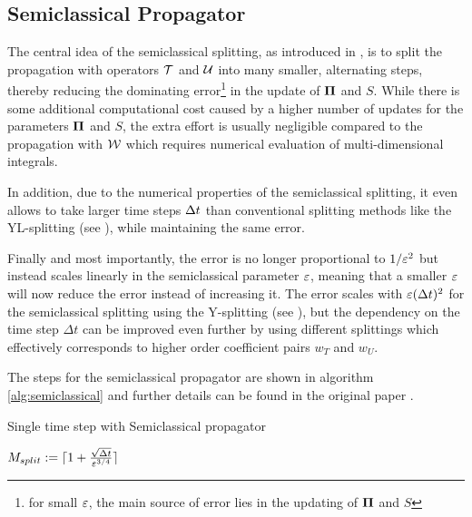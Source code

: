 \subsection{Semiclassical Propagator}
\label{sub:semiclassical_propagator}
%
The central idea of the semiclassical splitting, as introduced in \cite{GH_convsemiclassical},
is to split the propagation with operators $\mathcal{T}$ and $\mathcal{U}$ into many smaller, alternating steps, thereby reducing the dominating error\footnote{for small $\varepsilon$,
the main source of error lies in the updating of $\bm{\Pi}$ and $S$} in the update of $\bm{\Pi}$ and $S$.
While there is some additional computational cost caused by a higher number of updates for the parameters $\bm{\Pi}$ and $S$, the extra effort is usually negligible compared to the propagation with $\mathcal{W}$ which requires numerical evaluation of multi-dimensional integrals. 
\par\medskip
%
In addition, due to the numerical properties of the semiclassical splitting, 
it even allows to take larger time steps $\Delta t$ than conventional
splitting methods like the YL-splitting (see \cite{GH_convsemiclassical}), while maintaining the same error.
\par\medskip
%
Finally and most importantly, the error is no longer proportional to $1/\varepsilon^2$ but instead
scales linearly in the semiclassical parameter $\varepsilon$,
meaning that a smaller $\varepsilon$ will now reduce the error instead of increasing it.
The error scales with $\varepsilon (\Delta t)^2$ for the semiclassical splitting using the Y-splitting (see \cite{GH_convsemiclassical}),
but the dependency on the time step $\Delta t$ can be improved even further by using different
splittings which effectively corresponds to higher order coefficient pairs $w_T$ and $w_U$.
\par\medskip
%
The steps for the semiclassical propagator are shown in algorithm \ref{alg:semiclassical} and 
further details can be found in the original paper \cite{GH_convsemiclassical}.
%
\begin{algorithm}[ht]
	\caption{Single time step with Semiclassical propagator}
	\label{alg:semiclassical}
	\begin{algorithmic}
	\State
		\State
		\State $M_{split} := \lceil 1 + \frac{\sqrt{\Delta t}}{\varepsilon^{3/4}} \rceil$
		\State
		\State {}
		\State {}
		\State {}
		\State
	\EndProcedure
	\end{algorithmic}
\end{algorithm}


